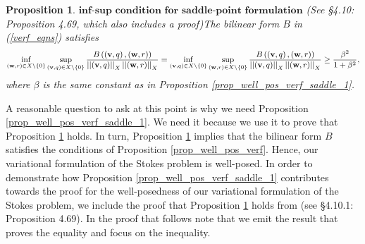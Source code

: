 \documentclass[12pt,a4paper]{article}
\newtheorem{proposition}[theorem]{Proposition}
\theoremstyle{definition}
\begin{document}
\begin{proposition}{$\textbf{inf-sup condition for saddle-point formulation}$} (See \cite{verfurth2013posteriori} \S 4.10: Proposition 4.69, which also includes a proof)\label{prop_well_pos_verf_saddle}
	The bilinear form $B$ in (\ref{verf_eqns}) satisfies
	\begin{equation}\small
	\begin{aligned}
	\inf_{\left(\textbf{w},r\right)\in X\setminus \lbrace0\rbrace}\sup_{\left(\textbf{v},q\right) \in X\setminus \lbrace0\rbrace}\frac{B\left(\left(\textbf{v},q\right),\left(\textbf{w},r\right)\right)}{\left|\left|\left(\textbf{v},q\right)\right|\right|_X\left|\left|\left(\textbf{w},r\right)\right|\right|_X}=
	\inf_{\left(\textbf{v},q\right) \in X\setminus \lbrace 0\rbrace}\sup_{\left(\textbf{w},r\right)\in X\setminus \lbrace0\rbrace}\frac{B\left(\left(\textbf{v},q\right),\left(\textbf{w},r\right)\right)}{\left|\left|\left(\textbf{v},q\right)\right|\right|_X\left|\left|\left(\textbf{w},r\right)\right|\right|_X}\geq \frac{\beta^2}{1+\beta^2},\nonumber
	\end{aligned}
	\end{equation}
	where $\beta$ is the same constant as in Proposition \ref{prop_well_pos_verf_saddle_1}.
\end{proposition}
A reasonable question to ask at this point is why we need Proposition \ref{prop_well_pos_verf_saddle_1}.  We need it because we use it to prove that Proposition \ref{prop_well_pos_verf_saddle} holds.  In turn, Proposition \ref{prop_well_pos_verf_saddle} implies that the bilinear form $B$ satisfies the conditions of Proposition \ref{prop_well_pos_verf}.  Hence, our variational formulation of the Stokes problem is well-posed.  In order to demonstrate how Proposition \ref{prop_well_pos_verf_saddle_1} contributes towards the proof for the well-posedness of our variational formulation of the Stokes problem, we include the proof that Proposition \ref{prop_well_pos_verf_saddle} holds from \cite{verfurth2013posteriori} (see \S4.10.1: Proposition 4.69).  In the proof that follows note that we emit the result that proves the equality and focus on the inequality.
\end{document}
